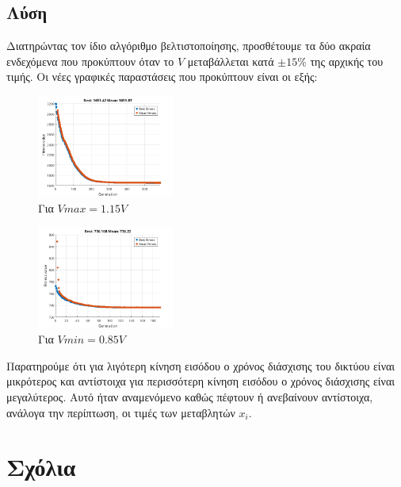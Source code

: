 \documentclass[twocolumn]{report}
\begin{document}
\subsection*{Λύση}
Διατηρώντας τον ίδιο αλγόριθμο βελτιστοποίησης, προσθέτουμε τα δύο ακραία ενδεχόμενα 
που προκύπτουν όταν το $V$ μεταβάλλεται κατά $\pm 15\%$ της αρχικής του τιμής.
Οι νέες γραφικές παραστάσεις που προκύπτουν είναι οι εξής:
\begin{figure}[H]
    \centering
    \includegraphics[width=0.4\textwidth]{media/plotVmax.png}
    \caption{Για $Vmax = 1.15V$}
\end{figure}
\begin{figure}[H]
    \centering
    \includegraphics[width=0.4\textwidth]{media/plotVmin.png}
    \caption{Για $Vmin = 0.85V$}
\end{figure}
Παρατηρούμε ότι για λιγότερη κίνηση εισόδου ο χρόνος διάσχισης του δικτύου είναι
μικρότερος και αντίστοιχα για περισσότερη κίνηση εισόδου ο χρόνος διάσχισης είναι
μεγαλύτερος. Αυτό ήταν αναμενόμενο καθώς πέφτουν ή ανεβαίνουν αντίστοιχα, ανάλογα
την περίπτωση, οι τιμές των μεταβλητών $x_i$. 

\section*{Σχόλια}

\end{document}

